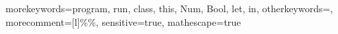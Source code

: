  {
	morekeywords={program, run, class, this, Num, Bool, let, in},
	otherkeywords={},
	morecomment=[l]{\%\%},
	sensitive=true,
	mathescape=true
}

\newcommand{\papljcode}[1]{\lstinline[language=SDF,basicstyle=\lstinlinestyle,breaklines=false]{#1}}
\newcommand{\papljcodebl}[1]{\lstinline[language=SDF,basicstyle=\lstinlinestyle,breaklines=true]{#1}}
\newcommand{\paplj}{\langname{PAPLJ}}
